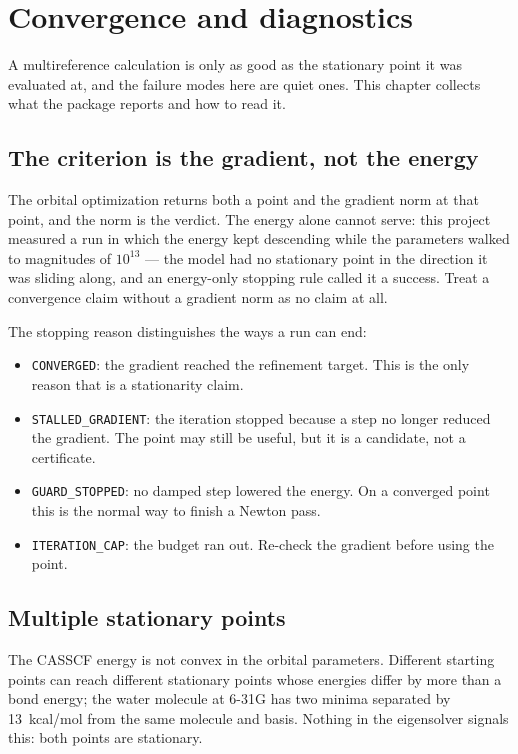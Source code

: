 \section{Convergence and diagnostics}
\label{sec:convergence}

A multireference calculation is only as good as the stationary point
it was evaluated at, and the failure modes here are quiet ones.  This
chapter collects what the package reports and how to read it.

\subsection{The criterion is the gradient, not the energy}

The orbital optimization returns both a point and the gradient norm at
that point, and the norm is the verdict.  The energy alone cannot
serve: this project measured a run in which the energy kept descending
while the parameters walked to magnitudes of $10^{13}$ --- the model
had no stationary point in the direction it was sliding along, and an
energy-only stopping rule called it a success.  Treat a convergence
claim without a gradient norm as no claim at all.

The stopping reason distinguishes the ways a run can end:

\begin{itemize}
  \item \texttt{CONVERGED}: the gradient reached the refinement
    target.  This is the only reason that is a stationarity claim.
  \item \texttt{STALLED\_GRADIENT}: the iteration stopped because a
    step no longer reduced the gradient.  The point may still be
    useful, but it is a candidate, not a certificate.
  \item \texttt{GUARD\_STOPPED}: no damped step lowered the energy.
    On a converged point this is the normal way to finish a Newton
    pass.
  \item \texttt{ITERATION\_CAP}: the budget ran out.  Re-check the
    gradient before using the point.
\end{itemize}

\subsection{Multiple stationary points}

The CASSCF energy is not convex in the orbital parameters.  Different
starting points can reach different stationary points whose energies
differ by more than a bond energy; the water molecule at 6-31G has two
minima separated by 13~kcal/mol from the same molecule and basis.
Nothing in the eigensolver signals this: both points are stationary.

